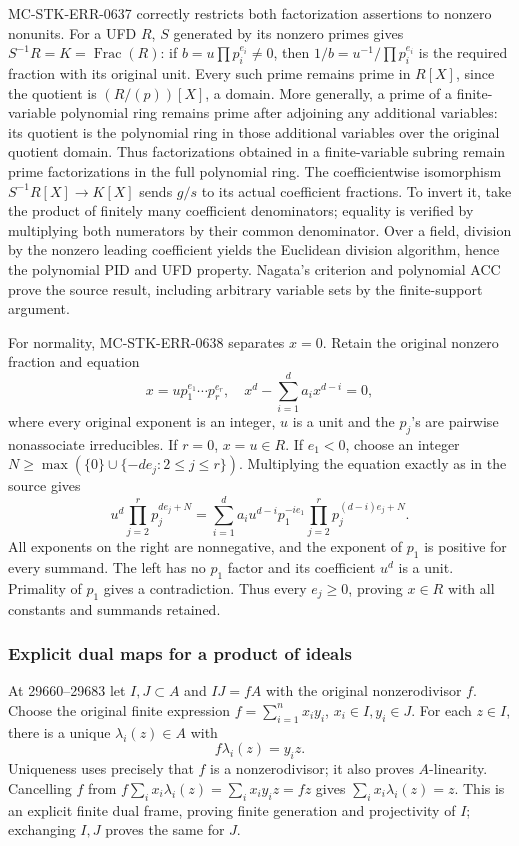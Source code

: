 MC-STK-ERR-0637 correctly restricts both factorization assertions to nonzero nonunits. For a UFD \(R\), \(S\) generated by its nonzero primes gives \(S^{-1}R=K=\operatorname{Frac}(R)\): if \(b=u\prod p_i^{e_i}\ne0\), then \(1/b=u^{-1}/\prod p_i^{e_i}\) is the required fraction with its original unit. Every such prime remains prime in \(R[X]\), since the quotient is \((R/(p))[X]\), a domain. More generally, a prime of a finite-variable polynomial ring remains prime after adjoining any additional variables: its quotient is the polynomial ring in those additional variables over the original quotient domain. Thus factorizations obtained in a finite-variable subring remain prime factorizations in the full polynomial ring. The coefficientwise isomorphism \(S^{-1}R[X]\to K[X]\) sends \(g/s\) to its actual coefficient fractions. To invert it, take the product of finitely many coefficient denominators; equality is verified by multiplying both numerators by their common denominator. Over a field, division by the nonzero leading coefficient yields the Euclidean division algorithm, hence the polynomial PID and UFD property. Nagata's criterion and polynomial ACC prove the source result, including arbitrary variable sets by the finite-support argument.

For normality, MC-STK-ERR-0638 separates \(x=0\). Retain the original nonzero fraction and equation \[
 x=u p_1^{e_1}\cdots p_r^{e_r},\quad
 x^d-\sum_{i=1}^d a_i x^{d-i}=0,
\] where every original exponent is an integer, \(u\) is a unit and the \(p_j\)'s are pairwise nonassociate irreducibles. If \(r=0\), \(x=u\in R\). If \(e_1<0\), choose an integer \(N\ge\max(\{0\}\cup\{-d e_j:2\le j\le r\})\). Multiplying the equation exactly as in the source gives \[
 u^d\prod_{j=2}^r p_j^{de_j+N}
 =\sum_{i=1}^d a_i u^{d-i}p_1^{-i e_1}
                  \prod_{j=2}^r p_j^{(d-i)e_j+N}.
\] All exponents on the right are nonnegative, and the exponent of \(p_1\) is positive for every summand. The left has no \(p_1\) factor and its coefficient \(u^d\) is a unit. Primality of \(p_1\) gives a contradiction. Thus every \(e_j\ge0\), proving \(x\in R\) with all constants and summands retained.

\subsubsection{Explicit dual maps for a product of ideals}\label{explicit-dual-maps-for-a-product-of-ideals}

At 29660--29683 let \(I,J\subset A\) and \(IJ=fA\) with the original nonzerodivisor \(f\). Choose the original finite expression \(f=\sum_{i=1}^n x_i y_i\), \(x_i\in I,y_i\in J\). For each \(z\in I\), there is a unique \(\lambda_i(z)\in A\) with \[
 f\lambda_i(z)=y_i z.
\] Uniqueness uses precisely that \(f\) is a nonzerodivisor; it also proves \(A\)-linearity. Cancelling \(f\) from \(f\sum_i x_i\lambda_i(z)=\sum_i x_i y_i z=fz\) gives \(\sum_i x_i\lambda_i(z)=z\). This is an explicit finite dual frame, proving finite generation and projectivity of \(I\); exchanging \(I,J\) proves the same for \(J\).

